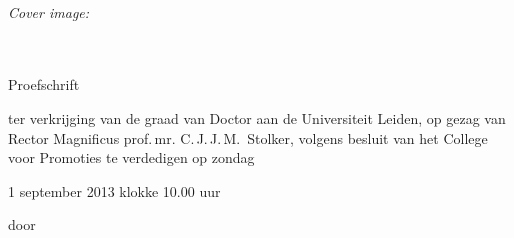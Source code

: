 \thesisprintdetails\\

\emph{Cover image:} \thesiscoverimgdesc\\
\clearpage


\begin{center}
  {
    {\Huge \thesistitle }\\[1em]
    {\huge \thesissubtitle }\\[5em]
    {\Large Proefschrift}\\[5em]
    {\Large \parbox{0.65 \textwidth}{ter verkrijging van de graad van Doctor aan de Universiteit Leiden, op gezag van Rector Magnificus prof.\,mr. C.\,J.\,J.\,M.\ Stolker,
volgens besluit van het College voor Promoties
te verdedigen op zondag \linebreak\centerline{1 september 2013 klokke 10.00 uur}}}\vfill
	{\Large door}\\[3em]
	{\parbox[c][][c]{0.65 \textwidth}{\centering\Large\thesisauthor\\ \thesisauthorborn}}
  }
\end{center}

\clearpage

{%
\large%
\hspace{3.6cm}\parbox[t]{0.7\textwidth}{%
\thesispromotores}\\[1cm]
}
{%
\large%
\hspace{3.6cm}\parbox[t]{0.7\textwidth}{%
\thesiscomittee}
}
\vfill

{\thesisfunding}

\clearpage


\vspace*{0.25\textheight}
\begin{center}
\emph{\thesisproverb}
\vspace*{0.5\textheight}

\emph{\thesisdedication}
\end{center}

\cleardoublepage


\hypersetup{pageanchor=true}

\restoregeometry
\setcounter{tocdepth}{1}
\hypertarget{toc}{}
\tableofcontents

\cleardoublepage
{}
